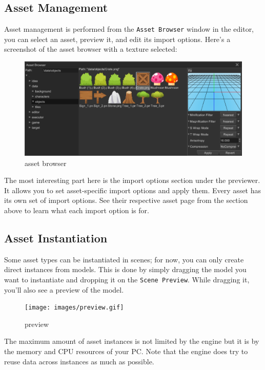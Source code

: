 \documentclass[
]{book}
\theoremstyle{definition}
\theoremstyle{definition}
\theoremstyle{definition}
\theoremstyle{definition}
\theoremstyle{remark}
\begin{document}
\subsection{Asset Management}\label{asset-management-1}

Asset management is performed from the \texttt{Asset\ Browser} window in the editor, you can select an asset, preview it, and edit its import options. Here's a screenshot of the asset browser with a texture selected:

\begin{figure}
\centering
\includegraphics{images/beginning_assets.png}
\caption{asset browser}
\end{figure}

The most interesting part here is the import options section under the previewer. It allows you to set asset-specific import options and apply them. Every asset has its own set of import options. See their respective asset page from the section above to learn what each import option is for.

\subsection{Asset Instantiation}\label{asset-instantiation}

Some asset types can be instantiated in scenes; for now, you can only create direct instances from models. This is done by simply dragging the model you want to instantiate and dropping it on the \texttt{Scene\ Preview}. While dragging it, you'll also see a preview of the model.

\begin{figure}
\centering
\texttt{[image: images/preview.gif]}
\caption{preview}
\end{figure}

The maximum amount of asset instances is not limited by the engine but it is by the memory and CPU resources of your PC. Note that the engine does try to reuse data across instances as much as possible.
\end{document}
